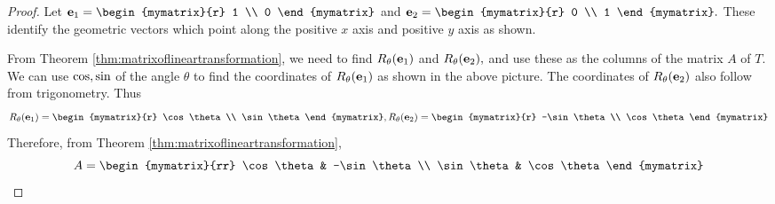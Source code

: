 \begin{proof}
Let $\vect{e}_{1} = \begin{mymatrix}{r}
1 \\
0
\end{mymatrix} $ and $\vect{e}_{2} = \begin{mymatrix}{r}
0 \\
1
\end{mymatrix} .$ These identify the geometric vectors which point along the
positive $x$ axis and positive $y$ axis as shown.

\begin{center}
\end{center}
 
From Theorem \ref{thm:matrixoflineartransformation}, we need to find $R_{\theta}({\bf e}_{1})$ and $R_{\theta}({\bf e}_{2}), $
and use these as the columns of the matrix $A$ of $T$. We can use  
$\mbox{cos},\mbox{sin}$ of the angle $\theta$ to find the coordinates of $R_{\theta}({\bf e}_{1})$ as shown
in the above picture. The coordinates of $R_{\theta}({\bf e}_{2})$ also follow from
trigonometry. Thus
\begin{equation*}
R_{\theta}(\vect{e}_{1})=\begin{mymatrix}{r}
\cos \theta \\
\sin \theta
\end{mymatrix} ,R_{\theta}(\vect{e}_{2})=\begin{mymatrix}{r}
-\sin \theta \\
\cos \theta
\end{mymatrix} 
\end{equation*}
Therefore, from Theorem \ref{thm:matrixoflineartransformation},
\begin{equation*}
A=\begin{mymatrix}{rr}
\cos \theta & -\sin \theta \\
\sin \theta & \cos \theta
\end{mymatrix}
\end{equation*}


\end{proof}
